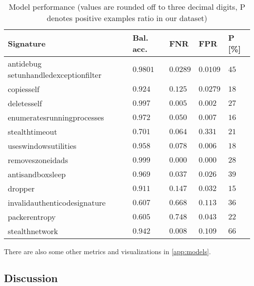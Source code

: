 \begin{table}[h]
  \centering
  \caption{Model performance (values are rounded off to three decimal digits, P denotes positive examples ratio in our dataset)}
  \begin{tabular}{lllll}
      \toprule
      \textbf{Signature} &
      \textbf{Bal. acc.} &
      \textbf{FNR} &
      \textbf{FPR} &
      \textbf{P [\%]}
      \\
      \midrule
      antidebug setunhandledexceptionfilter & $0.9801$ & $0.0289$ & $0.0109$ & $45$ \\
      \midrule
      copiesself & $0.924$ & $0.125$ & $0.0279$ & $18$ \\
      \midrule
      deletesself & $0.997$ & $0.005$ & $0.002$ & $27$ \\
      \midrule
      enumeratesrunningprocesses & $0.972$ & $0.050$ & $0.007$ & $16$ \\
      \midrule
      stealthtimeout & $0.701$ & $0.064$ & $0.331$ & $21$ \\
      \midrule
      useswindowsutilities & $0.958$ & $0.078$ & $0.006$ & $18$ \\
      \midrule
      removeszoneidads & $0.999$ & $0.000$ & $0.000$ & $28$ \\
      \midrule[0.3pt]
      \midrule[0.3pt]
      antisandboxsleep & $0.969$ & $0.037$ & $0.026$ & $39$ \\
      \midrule
      dropper & $0.911$ & $0.147$ & $0.032$ & $15$ \\
      \midrule
      invalidauthenticodesignature & $0.607$ & $0.668$ & $0.113$ & $36$ \\
      \midrule
      packerentropy & $0.605$ & $0.748$ & $0.043$ & $22$ \\
      \midrule
      stealthnetwork & $0.942$ & $0.008$ & $0.109$ & $66$ \\
      \bottomrule
  \end{tabular}
  \label{tab:models_res}
\end{table}

There are also some other metrics and visualizations in \ref{app:models}.

\subsection{Discussion}
